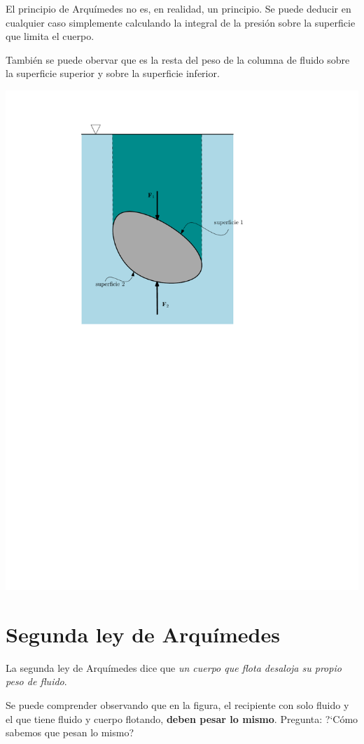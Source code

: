 	El principio de Arquímedes no es, en realidad, un principio. Se puede deducir en cualquier caso simplemente calculando la integral de la presión sobre la superficie que limita el cuerpo.
	
	También se puede obervar que es la resta del peso de la columna de fluido sobre la superficie superior y sobre la superficie inferior.
	
\begin{center}
	\includegraphics[width=0.5\columnwidth]{TeX_files/chapter02-Hidrostatica/arquimedes2}
\end{center}
\section{Segunda ley de Arquímedes}


	La segunda ley de Arquímedes dice que \emph{un cuerpo que flota desaloja su propio peso de fluido}. 
	
	Se puede comprender observando que en la figura, el recipiente con solo fluido y el que tiene fluido y cuerpo flotando, \textbf{deben pesar lo mismo}. Pregunta: ?`Cómo sabemos que pesan lo mismo?


